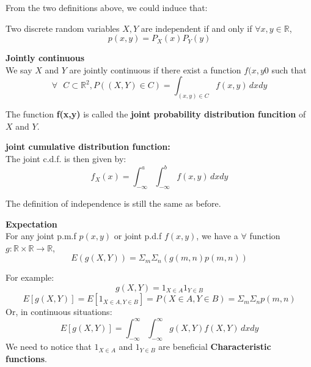 \documentclass{article}
\begin{document}
From the two definitions above, we could induce that:
\begin{theorem}
    Two discrete random variables $X,Y$ are independent if and only if $\forall x,y \in \mathbb{R}$,
    $$ p(x,y) = P_X(x)P_Y(y)$$
\end{theorem}



\begin{definition}
    \textbf{Jointly continuous}\\
    We say $X$ and $Y$ are jointly continuous if there exist a function $f(x,y0$ such that 
    $$\forall \text{ } C \subset \mathbb{R}^2, P((X,Y) \in C) = \int_{(x,y) \in C}f(x,y) \,dxdy$$
\end{definition}
The function \textbf{f(x,y)} is called the\textbf{ joint probability distribution funcition }of $X$ and $Y$.\\

\begin{definition}
    \textbf{ joint cumulative distribution function: }\\
    The joint c.d.f. is then given by:
    $$ f_X(x) = \int^a_{-\infty}\int^b_{-\infty} f(x,y)\, dxdy$$
\end{definition}
The definition of independence is still the same as before.

\begin{definition}
    \textbf{Expectation}\\
    For any joint p.m.f $p(x,y)$ or joint p.d.f $f(x,y)$, we have a $\forall$ function $g : \mathbb{R}\times\mathbb{R} \longrightarrow \mathbb{R}$,
    $$ E(g(X,Y)) = \Sigma_m\Sigma_n(g(m,n)p(m,n))$$
\end{definition}

For example:
$$ g(X,Y) = 1_{X \in A}1_{Y \in B}$$
$$ E[g(X,Y)] = E[1_{X \in A, Y \in B}] = P(X \in A, Y \in B) = \Sigma_m\Sigma_np(m,n)$$
Or, in continuous situations:
$$ E[g(X,Y)] = \int^\infty_{-\infty} \int^\infty_{-\infty}g(X,Y)f(X,Y) \, dxdy$$
We need to notice that $1_{X \in A}$ and $1_{Y \in B}$ are beneficial \textbf{Characteristic functions}.
\bigskip
\end{document}
